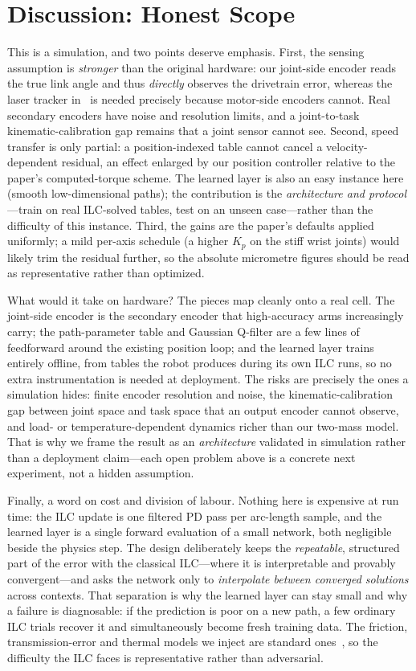\documentclass[10pt,twocolumn]{article}
\begin{document}
\section{Discussion: Honest Scope}\label{sec:disc}
This is a simulation, and two points deserve emphasis. First, the sensing
assumption is \emph{stronger} than the original hardware: our joint-side encoder
reads the true link angle and thus \emph{directly} observes the drivetrain error,
whereas the laser tracker in~\cite{schwegel2024} is needed precisely because
motor-side encoders cannot. Real secondary encoders have noise and resolution
limits, and a joint-to-task kinematic-calibration gap remains that a joint sensor
cannot see. Second, speed transfer is only partial: a position-indexed table
cannot cancel a velocity-dependent residual, an effect enlarged by our position
controller relative to the paper's computed-torque scheme. The learned layer is
also an easy instance here (smooth low-dimensional paths); the contribution is the
\emph{architecture and protocol}---train on real ILC-solved tables, test on an
unseen case---rather than the difficulty of this instance. Third, the gains are
the paper's defaults applied uniformly; a mild per-axis schedule (a higher $K_p$
on the stiff wrist joints) would likely trim the residual further, so the absolute
micrometre figures should be read as representative rather than optimized.

What would it take on hardware? The pieces map cleanly onto a real cell. The
joint-side encoder is the secondary encoder that high-accuracy arms increasingly
carry; the path-parameter table and Gaussian Q-filter are a few lines of
feedforward around the existing position loop; and the learned layer trains
entirely offline, from tables the robot produces during its own ILC runs, so no
extra instrumentation is needed at deployment. The risks are precisely the ones a
simulation hides: finite encoder resolution and noise, the kinematic-calibration
gap between joint space and task space that an output encoder cannot observe, and
load- or temperature-dependent dynamics richer than our two-mass model. That is
why we frame the result as an \emph{architecture} validated in simulation rather
than a deployment claim---each open problem above is a concrete next experiment,
not a hidden assumption.

Finally, a word on cost and division of labour. Nothing here is expensive at run
time: the ILC update is one filtered PD pass per arc-length sample, and the
learned layer is a single forward evaluation of a small network, both negligible
beside the physics step. The design deliberately keeps the \emph{repeatable},
structured part of the error with the classical ILC---where it is interpretable
and provably convergent---and asks the network only to \emph{interpolate between
converged solutions} across contexts. That separation is why the learned layer can
stay small and why a failure is diagnosable: if the prediction is poor on a new
path, a few ordinary ILC trials recover it and simultaneously become fresh
training data. The friction, transmission-error and thermal models we inject are
standard ones~\cite{armstrong1994,litak2003}, so the difficulty the ILC faces is
representative rather than adversarial.
\end{document}
